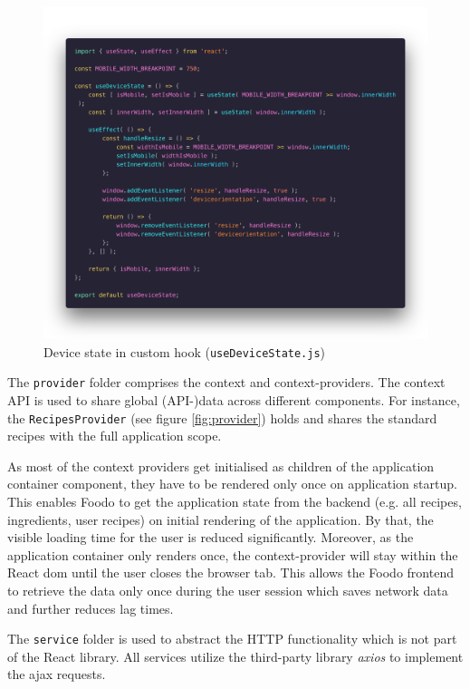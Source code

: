 \begin{figure}[!ht]
	\captionsetup{justification=centering}
	\centering
	\includegraphics[scale=0.28]{Ressourcen/img/code/hook.png}
	\vspace{-4em}
	\caption{Device state in custom hook (\texttt{useDeviceState.js})}
	\vspace{3em}
	\label{fig:hook}
\end{figure}
The \texttt{provider} folder comprises the context and context-providers. The context API is used to share global (API-)data across different components. For instance, the \texttt{RecipesProvider} (see figure \ref{fig:provider}) holds and shares the standard recipes with the full application scope.

As most of the context providers get initialised as children of the application container component, they have to be rendered only once on application startup. This enables Foodo to get the application state from the backend (e.g. all recipes, ingredients, user recipes) on initial rendering of the application. By that, the visible loading time for the user is reduced significantly. Moreover, as the application container only renders once, the context-provider will stay within the React \gls{dom} until the user closes the browser tab. This allows the Foodo frontend to retrieve the data only once during the user session which saves network data and further reduces lag times.

The \texttt{service} folder is used to abstract the HTTP functionality which is not part of the React library. All services utilize the third-party library \textit{axios} to implement the \gls{ajax} requests. 

